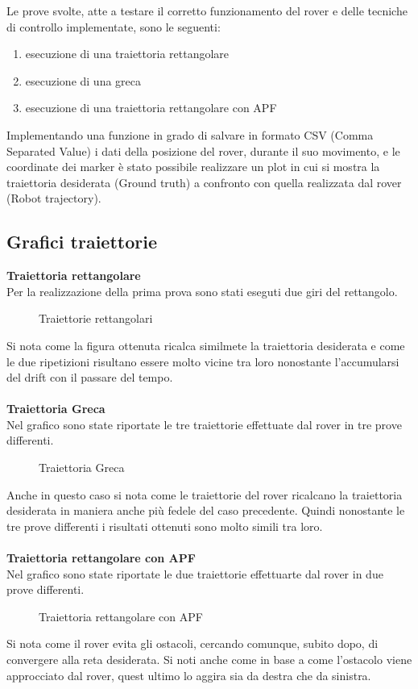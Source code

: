 \label{sec:res}
Le prove svolte, atte a testare il corretto funzionamento del rover e delle tecniche di controllo implementate, sono le seguenti:
\begin{enumerate}
  \item esecuzione di una traiettoria rettangolare 
  \item esecuzione di una greca 
  \item esecuzione di una traiettoria rettangolare con APF 
\end{enumerate}
 Implementando una funzione in grado di salvare in formato CSV (Comma Separated Value) i dati della posizione del rover, durante il suo movimento, e le coordinate dei marker è stato possibile realizzare un plot in cui si mostra la traiettoria desiderata (Ground truth) a confronto con quella realizzata dal rover (Robot trajectory).

\subsection{Grafici traiettorie}
\textbf{Traiettoria rettangolare}
\\Per la realizzazione della prima prova sono stati eseguti due giri del rettangolo.
\begin{figure} [H]
    \centering
    
    \caption{Traiettorie rettangolari}
    \label{fig:rect}
\end{figure} 
\noindent
Si nota come la figura ottenuta ricalca similmete la traiettoria desiderata e come le due ripetizioni risultano essere molto vicine tra loro nonostante l'accumularsi del drift con il passare del tempo.\\
\\ \textbf{Traiettoria Greca}
\\Nel grafico sono state riportate le tre traiettorie effettuate dal rover in tre prove differenti. 
\begin{figure} [H]
    \centering
    
    \caption{Traiettoria Greca}
    \label{fig:greca}
\end{figure} 
\noindent
 Anche in questo caso si nota come le traiettorie del rover ricalcano la traiettoria desiderata in maniera anche più fedele del caso precedente.
Quindi nonostante le tre prove differenti i risultati ottenuti sono molto simili tra loro.\\
\\ \textbf{Traiettoria rettangolare con APF}
\\Nel grafico sono state riportate le due traiettorie effettuarte dal rover in due prove differenti. 
\begin{figure} [H]
    \centering
    
    \caption{Traiettoria rettangolare con APF}
    \label{fig:rectAPF}
\end{figure} 
\noindent
 Si nota come il rover evita gli ostacoli, cercando comunque, subito dopo, di convergere alla reta desiderata.
Si noti anche come in base a come l'ostacolo viene approcciato dal rover, quest ultimo lo aggira sia da destra che da sinistra. 


